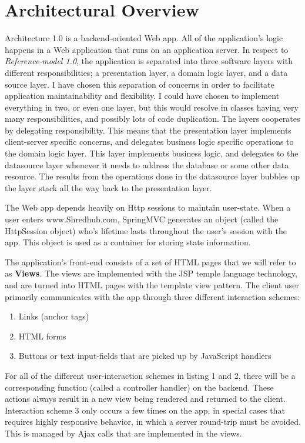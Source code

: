 \section{Architectural Overview}
Architecture 1.0 is a backend-oriented Web app. All of the application's logic happens in a Web application that runs on an application server. In respect to \textit{Reference-model 1.0}, the application is separated into three software layers with different responsibilities; a presentation layer, a domain logic layer, and a data source layer. I have chosen this separation of concerns in order to facilitate application maintainability and flexibility. I could have chosen to implement everything in two, or even one layer, but this would resolve in classes having very many responsibilities, and possibly lots of code duplication. The layers cooperates by delegating responsibility. This means that the presentation layer implements client-server specific concerns, and delegates business logic specific operations to the domain logic layer. This layer implements business logic, and delegates to the datasource layer whenever it needs to address the database or some other data resource. The results from the operations done in the datasource layer bubbles up the layer stack all the way back to the presentation layer.

The Web app depends heavily on Http sessions to maintain user-state. When a user enters www.Shredhub.com, SpringMVC generates an object (called the HttpSession object) who's lifetime lasts throughout the user's session with the app. This object is used as a container for storing state information.

The application's front-end consists of a set of HTML pages that we will refer to as \textbf{Views}. The views are implemented with the JSP temple language technology, and are turned into HTML pages with the template view pattern. The client user primarily communicates with the app through three different interaction schemes: 
\begin{enumerate}
\item {} Links (anchor tags) 
\item{} HTML forms
\item{} Buttons or text input-fields that are picked up by JavaScript handlers
\end{enumerate}
For all of the different user-interaction schemes in listing 1 and 2, there will be a corresponding function (called a controller handler) on the backend. These actions always result in a new view being rendered and returned to the client. Interaction scheme 3 only occurs a few times on the app, in special cases that requires highly responsive behavior, in which a server round-trip must be avoided. This is managed by Ajax calls that are implemented in the views. 


